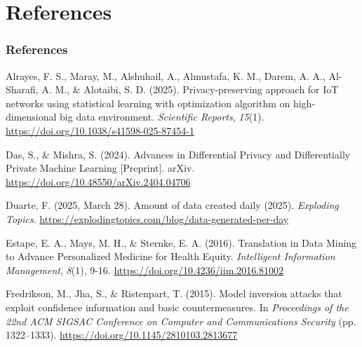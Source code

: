 \documentclass{beamer}
\begin{document}
\section{References}
\begin{frame}
\frametitle{References}

\footnotesize
\begin{thebibliography}{5}

 Alrayes, F. S., Maray, M., Alshuhail, A., Almustafa, K. M., Darem, A. A., Al-Sharafi, A. M., \& Alotaibi, S. D. (2025). Privacy-preserving approach for IoT networks using statistical learning with optimization algorithm on high-dimensional big data environment. \emph{Scientific Reports}, \emph{15}(1). \href{https://doi.org/10.1038/s41598-025-87454-1}{https://doi.org/10.1038/s41598-025-87454-1}

 Das, S., \& Mishra, S. (2024). Advances in Differential Privacy and Differentially Private Machine Learning [Preprint]. arXiv. \href{https://doi.org/10.48550/arXiv.2404.04706}{https://doi.org/10.48550/arXiv.2404.04706}

 Duarte, F. (2025, March 28). Amount of data created daily (2025). \emph{Exploding Topics}. \href{https://explodingtopics.com/blog/data-generated-per-day}{https://explodingtopics.com/blog/data-generated-per-day}

 Estape, E. A., Mays, M. H., \& Sternke, E. A. (2016). Translation in Data Mining to Advance Personalized Medicine for Health Equity. \emph{Intelligent Information Management}, \emph{8}(1), 9-16. \href{https://doi.org/10.4236/iim.2016.81002}{https://doi.org/10.4236/iim.2016.81002}

 Fredrikson, M., Jha, S., \& Ristenpart, T. (2015). Model inversion attacks that exploit confidence information and basic countermeasures. In \emph{Proceedings of the 22nd ACM SIGSAC Conference on Computer and Communications Security} (pp. 1322–1333). \href{https://doi.org/10.1145/2810103.2813677}{https://doi.org/10.1145/2810103.2813677}

\end{thebibliography}
\normalsize
\end{frame}
\end{document}

